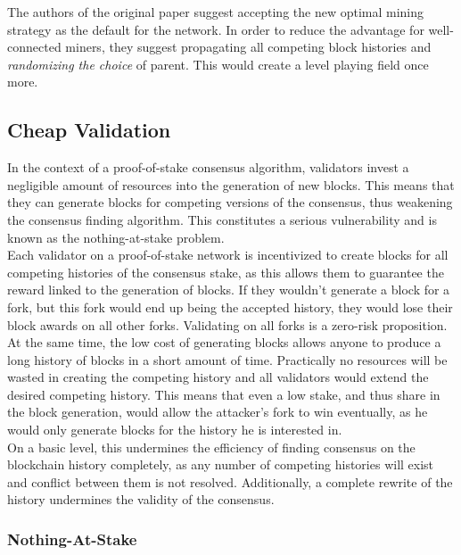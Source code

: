 \documentclass[12pt,a4paper]{article}
\begin{document}
The authors of the original paper suggest accepting the new optimal mining strategy as the default for the network. In order to reduce the advantage for well-connected miners, they suggest propagating all competing block histories and \textit{randomizing the choice} of parent. This would create a level playing field once more.\\

\subsection{Cheap Validation}

In the context of a proof-of-stake consensus algorithm, validators invest a negligible amount of resources into the generation of new blocks. This means that they can generate blocks for competing versions of the \gls{consensus}, thus weakening the consensus finding algorithm. This constitutes a serious vulnerability and is known as the nothing-at-stake problem.\\

Each validator on a proof-of-stake network is incentivized to create blocks for all competing histories of the consensus stake, as this allows them to guarantee the reward linked to the generation of blocks. If they wouldn't generate a block for a fork, but this fork would end up being the accepted history, they would lose their block awards on all other forks. Validating on all forks is a zero-risk proposition.\\

At the same time, the low cost of generating blocks allows anyone to produce a long history of blocks in a short amount of time. Practically no resources will be wasted in creating the competing history and all validators would extend the desired competing history. This means that even a low stake, and thus share in the block generation, would allow the attacker's fork to win eventually, as he would only generate blocks for the history he is interested in.\\

On a basic level, this undermines the efficiency of finding consensus on the blockchain history completely, as any number of competing histories will exist and conflict between them is not resolved. Additionally, a complete rewrite of the history undermines the validity of the \gls{consensus}.\\

\subsubsection{Nothing-At-Stake}
\end{document}
